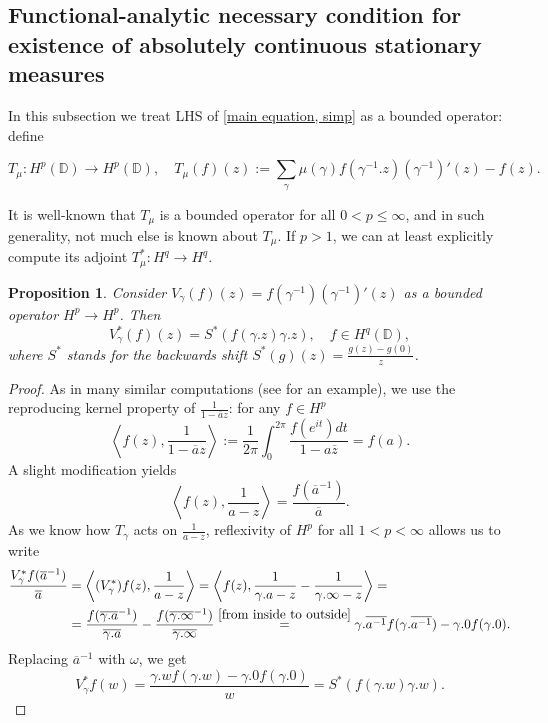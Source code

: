 \documentclass[11pt]{article}
\newtheorem{proposition}{Proposition}[section]
\begin{document}
\subsection{Functional-analytic necessary condition for existence of absolutely continuous stationary measures}

In this subsection we treat LHS of \eqref{main equation, simp} as a bounded operator: define

\[
T_\mu: H^p(\mathbb{D}) \rightarrow H^p(\mathbb{D}), \quad T_\mu(f)(z) := \sum_{\gamma} \mu(\gamma) f(\gamma^{-1}.z)(\gamma^{-1})'(z) - f(z).
\]

It is well-known that $T_\mu$ is a bounded operator for all $0 < p \le \infty$, and in such generality, not much else is known about $T_\mu$. If $p > 1$, we can at least explicitly compute its adjoint $T^*_\mu : H^q \rightarrow H^q$.

\begin{proposition}
	Consider $V_\gamma(f)(z) = f(\gamma^{-1})(\gamma^{-1})'(z)$ as a bounded operator $H^p \rightarrow H^p$. Then
	\[
	V^*_\gamma(f)(z) = S^*(f(\gamma.z) \gamma.z), \quad f \in H^q(\mathbb{D}),
	\]
	where $S^*$ stands for the backwards shift $S^*(g)(z) = \frac{g(z) - g(0)}{z}$.
\end{proposition}
\begin{proof}
	As in many similar computations (see \cite[Theorem 2]{cowen1988linear} for an example), we use the reproducing kernel property of $\frac{1}{1 - \overline{a}z}$: for any $f \in H^p$
	\[
	\left\langle f(z), \frac{1}{1 - \overline{a}z} \right\rangle := \frac{1}{2\pi} \int_{0}^{2 \pi} \frac{f(e^{it}) dt}{1 - a \overline{z}} = f(a).
 	\]
 	A slight modification yields
 	\[
 	\left\langle f(z), \frac{1}{a - z} \right\rangle = \frac{f(\overline{a}^{-1})}{\overline{a}}.
 	\]
 	As we know how $T_\gamma$ acts on $\frac{1}{a - z}$, reflexivity of $H^p$ for all $1 < p < \infty$ allows us to write
 	\[
 	\begin{aligned}
 		\frac{V^*_\gamma f(\overline{a}^{-1})}{\overline{a}} &= \left\langle (V_\gamma^*)f(z), \frac{1}{a - z} \right\rangle =  \left\langle f(z), \frac{1}{\gamma.a - z} - \frac{1}{\gamma.\infty - z} \right\rangle = \\ 
 		&=\frac{f(\overline{\gamma.a}^{-1})}{\overline{\gamma.a}} - \frac{f(\overline{\gamma.\infty}^{-1})}{\overline{\gamma.\infty}} \stackrel{\eqref{from inside to outside}}{=} \gamma.\overline{a^{-1}} f(\gamma.\overline{a^{-1}}) - \gamma.0 f(\gamma.0).
 	\end{aligned}
 	\]
 	Replacing $\overline{a}^{-1}$ with $\omega$, we get
 	\[
 	V^*_\gamma f(w) = \frac{\gamma.w f(\gamma.w) - \gamma.0 f(\gamma.0)}{w} = S^*(f(\gamma.w) \gamma.w).
 	\]
\end{proof}
\end{document}
